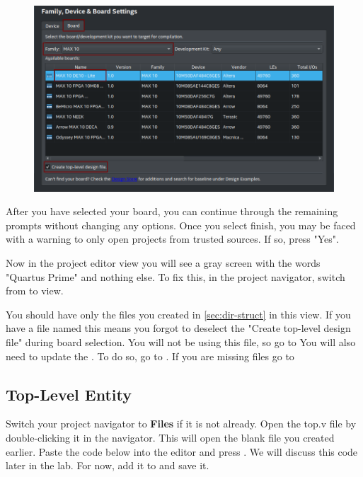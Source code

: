 \documentclass[12pt]{labmanual}
\begin{document}
\begin{figure}[H]
    \centering
    \includegraphics[width=\linewidth]{quartus_board.png}
\end{figure}

After you have selected your board, you can continue through the remaining prompts without changing any options. Once you select finish, you may be faced with a warning to only open projects from trusted sources. If so, press "Yes".

Now in the project editor view you will see a gray screen with the words "Quartus Prime" and nothing else. To fix this, in the project navigator, switch from  to  view.

\begin{important}
You should have only the files you created in \autoref{sec:dir-struct} in this view. If you have a file named  this means you forgot to deselect the "Create top-level design file" during board selection. You will not be using this file, so go to  You will also need to update the . To do so, go to . If you are missing files go to 
\end{important}


\subsection{Top-Level Entity}

Switch your project navigator to \textbf{Files} if it is not already. Open the top.v file by double-clicking it in the navigator. This will open the blank file you created earlier. Paste the code below into the editor and press . We will discuss this code later in the lab. For now, add it to  and save it.
\end{document}
